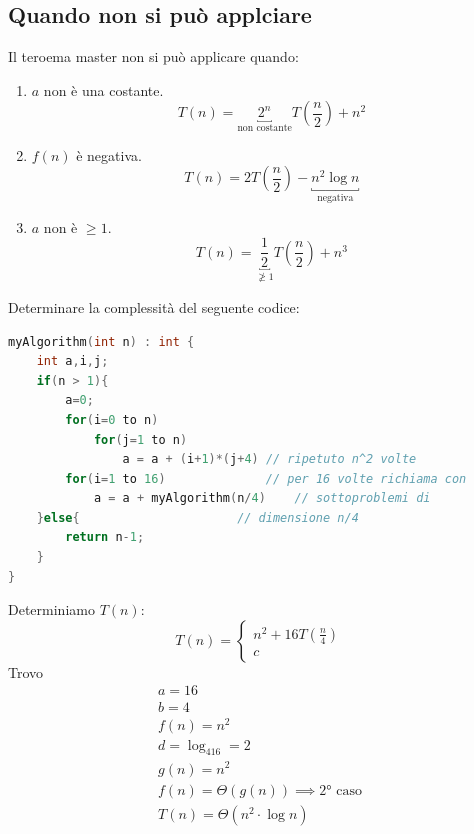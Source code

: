 \documentclass[italian]{article}
\newcommand{\fn}{f(n)}
\newcommand{\gn}{g(n)}
\newcommand{\example}{\text{\faCircleArrowRight $\;$ Esempio }}
\begin{document}
\subsection{Quando non si può applciare}
Il teroema master non si può applicare quando:
\begin{enumerate}[label=\arabic*)]
	\item $a$ non è una costante. 
		\[
			T(n) = \underbracket{2^n}_{\text{non costante}}T(\frac{n}{2}) + n^2
		\]
	\item $\fn$ è negativa. 
		\[
			T(n) = 2T(\frac{n}{2}) - \underbracket{n^2\log n}_{\text{negativa}}
		\]
	\item $a$ non è $\geq 1$. 
		\[
			T(n) = \underbracket{\frac{1}{2}}_{\text{$\not\geq 1$}}T(\frac{n}{2}) + n^3
		\]
\end{enumerate}
\example Determinare la complessità del seguente codice:
\begin{lstlisting}[language=c]
myAlgorithm(int n) : int {
	int a,i,j;
	if(n > 1){
		a=0;
		for(i=0 to n)
			for(j=1 to n)
				a = a + (i+1)*(j+4)	// ripetuto n^2 volte
		for(i=1 to 16)				// per 16 volte richiama con 
			a = a + myAlgorithm(n/4)	// sottoproblemi di 
	}else{						// dimensione n/4
		return n-1;
	}	
}
\end{lstlisting}
Determiniamo $T(n)$:
\[
	T(n) = 
	\begin{cases*}
		n^2 + 16T(\frac{n}{4}) \\
		c
 	\end{cases*}
\]
Trovo 
\begin{gather*}
	a = 16 \\
	b = 4 \\
	f(n) = n^2 \\
	d = \log_416 = 2 \\
	g(n) = n^2 \\
	\fn = \varTheta(\gn) \implies \text{2° caso}\\
	T(n) = \varTheta(n^2 \cdot \log n)
\end{gather*}

\pagebreak
\end{document}

